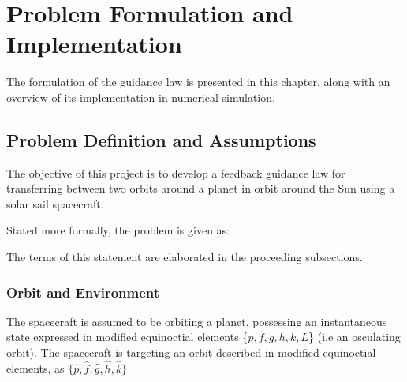 \chapter{Problem Formulation and Implementation}

The formulation of the guidance law is presented in this chapter, along with an overview of its implementation in numerical simulation.

\section{Problem Definition and Assumptions}
The objective of this project is to develop a feedback guidance law for transferring between two orbits around a planet in orbit around the Sun using a solar sail spacecraft.

Stated more formally, the problem is given as:


The terms of this statement are elaborated in the proceeding subsections.

\subsection{Orbit and Environment}
\label{sec:orbit_environment}
The spacecraft is assumed to be orbiting a planet, possessing an instantaneous state expressed in modified equinoctial elements \{$p, f, g, h, k, L$\} (i.e an osculating orbit). The spacecraft is targeting an orbit described in modified equinoctial elements, as $\{\hat{p}, \hat{f}, \hat{g}, \hat{h}, \hat{k}\}$

